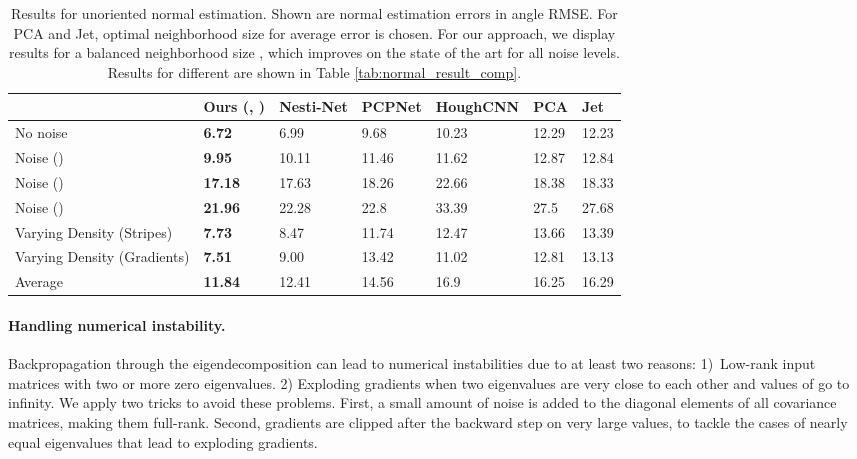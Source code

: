 \documentclass[10pt,twocolumn,letterpaper]{article}
\begin{document}
\begin{table*}[t]
\small
  \centering
\begin{tabular}{lllllll}
      \toprule
   & Ours (, ) & Nesti-Net \cite{Ben-Shabat:2018} & PCPNet \cite{Guerrero:2018} & HoughCNN \cite{Boulch:2016} & PCA & Jet \cite{Cazals:2003} \\ \midrule
No noise    & \textbf{6.72} & 6.99      & 9.68   & 10.23    &  12.29   &   12.23  \\ 
Noise () & \textbf{9.95}    & 10.11     & 11.46  & 11.62    &  12.87   &   12.84  \\ 
Noise ()   &   \textbf{17.18}  & 17.63     & 18.26  & 22.66    &  18.38   &   18.33  \\ 
Noise ()   &  \textbf{21.96}   & 22.28     & 22.8   & 33.39    &   27.5  &   27.68  \\ 
Varying Density (Stripes)    &    \textbf{7.73}         & 8.47      & 11.74  & 12.47    &   13.66  &   13.39  \\ 
Varying Density (Gradients)  &    \textbf{7.51}         & 9.00      & 13.42  & 11.02    &   12.81  &   13.13  \\ 
\midrule
Average &    \textbf{11.84}         & 12.41     & 14.56  & 16.9     &  16.25   &   16.29  \\
\bottomrule
\end{tabular}
\caption{Results for unoriented normal estimation. Shown are normal estimation errors in angle RMSE. For PCA and Jet, optimal neighborhood size for average error is chosen. For our approach, we display results for a balanced neighborhood size , which improves on the state of the art for all noise levels. Results for different  are shown in Table \ref{tab:normal_result_comp}.} \label{tab:pcpnet_results}
\vspace{-0.3cm}
\end{table*}

\paragraph{Handling numerical instability.} Backpropagation through the eigendecomposition can lead to numerical instabilities due to at least two reasons: \mbox{1) Low-rank} input matrices with two or more zero eigenvalues. 2) Exploding gradients when two eigenvalues are very close to each other and values of  go to infinity. We apply two tricks to avoid these problems. First, a small amount of noise is added to the diagonal elements of all covariance matrices, making them full-rank. Second, gradients are clipped after the backward step on very large values, to tackle the cases of nearly equal eigenvalues that lead to exploding gradients.
\end{document}
